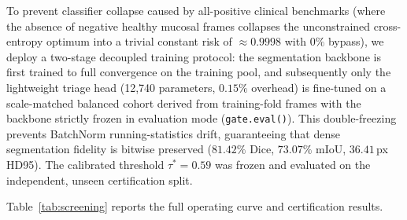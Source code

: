 \documentclass[journal]{IEEEtran}
\begin{document}
To prevent classifier collapse caused by all-positive clinical benchmarks (where the absence of negative healthy mucosal frames collapses the unconstrained cross-entropy optimum into a trivial constant risk of $\approx 0.9998$ with $0\%$ bypass), we deploy a two-stage decoupled training protocol: the segmentation backbone is first trained to full convergence on the training pool, and subsequently only the lightweight triage head (12,740 parameters, $0.15\%$ overhead) is fine-tuned on a scale-matched balanced cohort derived from training-fold frames with the backbone strictly frozen in evaluation mode (\texttt{gate.eval()}). This double-freezing prevents BatchNorm running-statistics drift, guaranteeing that dense segmentation fidelity is bitwise preserved ($81.42\%$ Dice, $73.07\%$ mIoU, $36.41$\,px HD95). The calibrated threshold $\tau^* = 0.59$ was frozen and evaluated on the independent, unseen certification split.

Table~\ref{tab:screening} reports the full operating curve and certification results.
\end{document}
